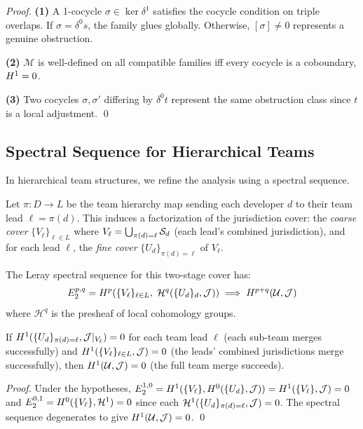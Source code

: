 \documentclass[11pt]{article}
\newcommand{\MergeFun}{\mathcal{M}}
\begin{document}
\begin{proof}
\textbf{(1)} A 1-cocycle $\sigma \in \ker \delta^1$ satisfies the cocycle
condition on triple overlaps. If $\sigma = \delta^0 s$, the family glues
globally. Otherwise, $[\sigma] \neq 0$ represents a genuine obstruction.

\textbf{(2)} $\MergeFun$ is well-defined on all compatible families iff every
cocycle is a coboundary, \ie $H^{1} = 0$.

\textbf{(3)} Two cocycles $\sigma, \sigma'$ differing by $\delta^0 t$
represent the same obstruction class since $t$ is a local adjustment. \qed
\end{proof}

\subsection{Spectral Sequence for Hierarchical Teams}

In hierarchical team structures, we refine the analysis using a spectral
sequence.

\begin{construction}
Let $\pi : D \to L$ be the team hierarchy map sending each developer $d$ to
their team lead $\ell = \pi(d)$. This induces a factorization of the
jurisdiction cover: the \emph{coarse cover} $\{V_\ell\}_{\ell \in L}$ where
$V_\ell = \bigcup_{\pi(d) = \ell} \mathcal{S}_d$ (each lead's combined jurisdiction),
and for each lead $\ell$, the \emph{fine cover}
$\{U_d\}_{\pi(d) = \ell}$ of $V_\ell$.

The Leray spectral sequence for this two-stage cover has:
\[
  E_2^{p,q} = H^{p}(\{V_\ell\}_{\ell \in L},\;
  \mathcal{H}^q(\{U_d\}_d, \mathcal{J}))
  \implies
  H^{p+q}(\mathcal{U}, \mathcal{J})
\]
where $\mathcal{H}^q$ is the presheaf of local cohomology groups.
\end{construction}

\begin{corollary}
If $H^{1}(\{U_d\}_{\pi(d)=\ell}, \mathcal{J}|_{V_\ell}) = 0$ for each team lead
$\ell$ (each sub-team merges successfully) and
$H^{1}(\{V_\ell\}_{\ell \in L}, \mathcal{J}) = 0$ (the leads' combined
jurisdictions merge successfully), then $H^{1}(\mathcal{U}, \mathcal{J}) = 0$
(the full team merge succeeds).
\end{corollary}

\begin{proof}
Under the hypotheses, $E_2^{1,0} = H^{1}(\{V_\ell\}, H^{0}(\{U_d\}, \mathcal{J})) =
H^{1}(\{V_\ell\}, \mathcal{J}) = 0$ and
$E_2^{0,1} = H^{0}(\{V_\ell\}, \mathcal{H}^1) = 0$ since each
$\mathcal{H}^1(\{U_d\}_{\pi(d)=\ell}, \mathcal{J}) = 0$. The spectral sequence
degenerates to give $H^{1}(\mathcal{U}, \mathcal{J}) = 0$. \qed
\end{proof}
\end{document}
